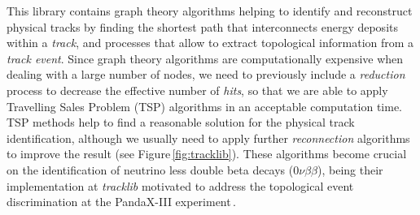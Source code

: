 This library contains graph theory algorithms helping to identify and reconstruct physical tracks by finding the shortest path that interconnects energy deposits within a \emph{track}, and processes that allow to extract topological information from a \emph{track event}. Since graph theory algorithms are computationally expensive when dealing with a large number of nodes, we need to previously include a \emph{reduction} process to decrease the effective number of \emph{hits}, so that we are able to apply Travelling Sales Problem (TSP) algorithms in an acceptable computation time. TSP methods help to find a reasonable solution for the physical track identification, although we usually need to apply further \emph{reconnection} algorithms to improve the result (see Figure\,\ref{fig:tracklib}). These algorithms become crucial on the identification of neutrino less double beta decays ($0\nu\beta\beta$), being their implementation at \emph{tracklib} motivated to address the topological event discrimination at the PandaX-III experiment\,\cite{Galan:2019ake}.

